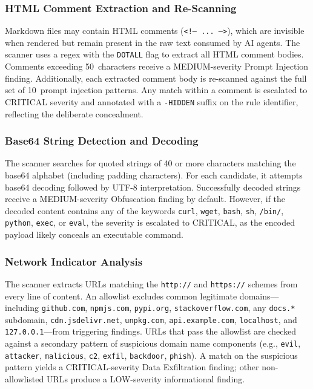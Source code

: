 \subsubsection{HTML Comment Extraction and Re-Scanning}

Markdown files may contain HTML comments (\texttt{<!--~...~-->}), which are invisible when rendered but remain present in the raw text consumed by AI agents. The scanner uses a regex with the \texttt{DOTALL} flag to extract all HTML comment bodies. Comments exceeding 50~characters receive a MEDIUM-severity Prompt Injection finding. Additionally, each extracted comment body is re-scanned against the full set of 10~prompt injection patterns. Any match within a comment is escalated to CRITICAL severity and annotated with a \texttt{-HIDDEN} suffix on the rule identifier, reflecting the deliberate concealment.

\subsubsection{Base64 String Detection and Decoding}

The scanner searches for quoted strings of 40 or more characters matching the base64 alphabet (including padding characters). For each candidate, it attempts base64 decoding followed by UTF-8 interpretation. Successfully decoded strings receive a MEDIUM-severity Obfuscation finding by default. However, if the decoded content contains any of the keywords \texttt{curl}, \texttt{wget}, \texttt{bash}, \texttt{sh}, \texttt{/bin/}, \texttt{python}, \texttt{exec}, or \texttt{eval}, the severity is escalated to CRITICAL, as the encoded payload likely conceals an executable command.

\subsubsection{Network Indicator Analysis}

The scanner extracts URLs matching the \texttt{http://} and \texttt{https://} schemes from every line of content. An allowlist excludes common legitimate domains---including \texttt{github.com}, \texttt{npmjs.com}, \texttt{pypi.org}, \texttt{stackoverflow.com}, any \texttt{docs.*} subdomain, \texttt{cdn.jsdelivr.net}, \texttt{unpkg.com}, \texttt{api.example.com}, \texttt{localhost}, and \texttt{127.0.0.1}---from triggering findings. URLs that pass the allowlist are checked against a secondary pattern of suspicious domain name components (e.g., \texttt{evil}, \texttt{attacker}, \texttt{malicious}, \texttt{c2}, \texttt{exfil}, \texttt{backdoor}, \texttt{phish}). A match on the suspicious pattern yields a CRITICAL-severity Data Exfiltration finding; other non-allowlisted URLs produce a LOW-severity informational finding.

